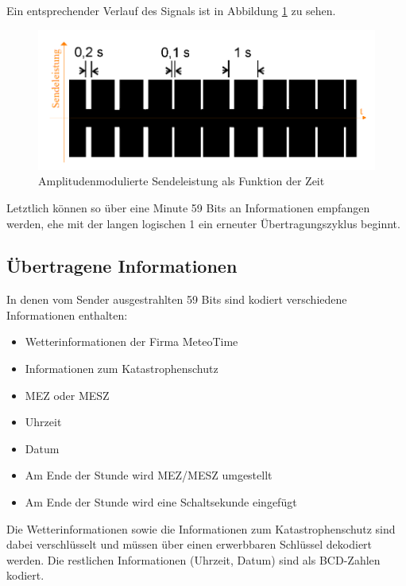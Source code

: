 			Ein entsprechender Verlauf des Signals ist in Abbildung \ref{fig:DCF77_Impulse} zu sehen.
			
			\begin{figure}[H]
				\centering
				\includegraphics[width=12cm]{Grafiken/DCF77_Impulse}
				\caption[Amplitudenmodulierte Sendeleistung als Funktion der Zeit]{Amplitudenmodulierte Sendeleistung als Funktion der Zeit\protect\footnotemark}
				\label{fig:DCF77_Impulse}
			\end{figure}
			
			Letztlich können so über eine Minute 59 Bits an Informationen empfangen werden, ehe mit der langen logischen 1 ein erneuter Übertragungszyklus beginnt.
			
			\cite{DCF77Wiki}
		\subsection{Übertragene Informationen}
			In denen vom Sender ausgestrahlten 59 Bits sind kodiert verschiedene Informationen enthalten:
			
			\newpage
			\begin{itemize}
				\item Wetterinformationen der Firma MeteoTime
				\item Informationen zum Katastrophenschutz
				\item MEZ oder MESZ
				\item Uhrzeit
				\item Datum
				\item Am Ende der Stunde wird MEZ/MESZ umgestellt
				\item Am Ende der Stunde wird eine Schaltsekunde eingefügt
			\end{itemize}
			
			Die Wetterinformationen sowie die Informationen zum Katastrophenschutz sind dabei verschlüsselt und müssen über einen erwerbbaren Schlüssel dekodiert werden. Die restlichen Informationen (Uhrzeit, Datum) sind als BCD-Zahlen kodiert.
			
